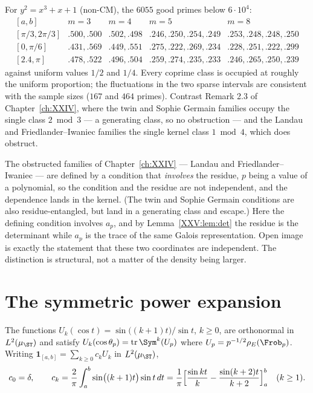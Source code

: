 \begin{remark}\label{XXV:rem:numjoint}
For $y^2=x^3+x+1$ (non-CM), the $6055$ good primes below $6\cdot10^4$:
\[
\begin{array}{lcccc}
[a,b] & m=3 & m=4 & m=5 & m=8\\\hline
[\pi/3,2\pi/3] & .500,.500 & .502,.498 & .246,.250,.254,.249 & .253,.248,.248,.250\\
{[0,\pi/6]} & .431,.569 & .449,.551 & .275,.222,.269,.234 & .228,.251,.222,.299\\
{[2.4,\pi]} & .478,.522 & .496,.504 & .259,.274,.235,.233 & .246,.265,.250,.239
\end{array}
\]
against uniform values $1/2$ and $1/4$. Every coprime class is occupied at roughly the
uniform proportion; the fluctuations in the two sparse intervals are consistent with the
sample sizes ($167$ and $464$ primes). Contrast Remark 2.3 of Chapter~\ref{ch:XXIV}, where the twin
and Sophie Germain families occupy the single class $2\bmod3$ --- a generating class, so no
obstruction --- and the Landau and
Friedlander--Iwaniec families the single kernel class $1\bmod4$, which does obstruct.
\end{remark}

\begin{remark}\label{XXV:rem:whypass}
The obstructed families of Chapter~\ref{ch:XXIV} --- Landau and Friedlander--Iwaniec --- are defined by
a condition that \emph{involves}
the residue, $p$ being a value of a polynomial, so the condition and
the residue are not independent, and the dependence lands in the kernel. (The twin and
Sophie Germain conditions are also residue-entangled, but land in a generating class and
escape.) Here the defining condition involves $a_p$, and by
Lemma~\ref{XXV:lem:det} the residue is the determinant while $a_p$ is the trace of the same
Galois representation. Open image is exactly the statement that these two coordinates are
independent. The distinction is structural, not a matter of the density being larger.
\end{remark}

\section{The symmetric power expansion}

\begin{proposition}\label{XXV:prop:cheb}
The functions $U_k(\cos t)=\sin\bigl((k+1)t\bigr)/\sin t$, $k\ge0$, are orthonormal in
$L^2(\mu_\ST)$ and satisfy $U_k(\cos\theta_p)=\Tr\Sym^k(U_p)$ where
$U_p=p^{-1/2}\rho_E(\Frob_p)$. Writing
$\mathbf 1_{[a,b]}=\sum_{k\ge0}c_kU_k$ in $L^2(\mu_\ST)$,
\[
c_0=\delta,\qquad
c_k=\frac{2}{\pi}\int_a^b\sin\bigl((k+1)t\bigr)\sin t\,dt
=\frac1\pi\Bigl[\frac{\sin kt}{k}-\frac{\sin(k+2)t}{k+2}\Bigr]_a^b\quad(k\ge1).
\]
\end{proposition}

